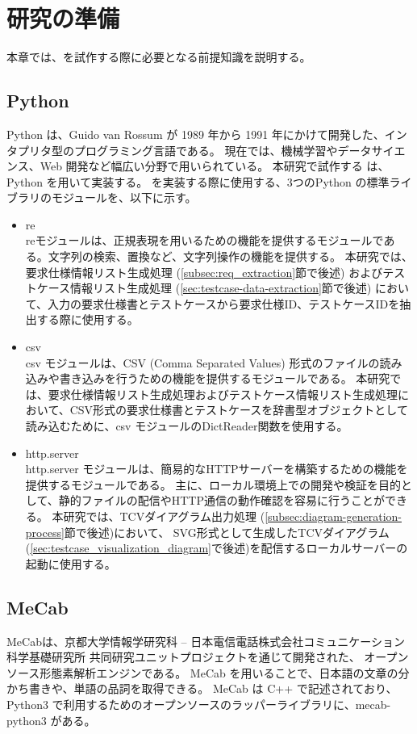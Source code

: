 \chapter{研究の準備}\label{cha:Preparation}

本章では、\tool{}を試作する際に必要となる前提知識を説明する。

\section{Python}\label{sec:Python}
Python \cite{python} は、Guido van Rossum が 1989 年から 1991 年にかけて開発した、インタプリタ型のプログラミング言語である。
現在では、機械学習やデータサイエンス、Web 開発など幅広い分野で用いられている。
本研究で試作する \tool は、Python を用いて実装する。
\tool を実装する際に使用する、3つのPython の標準ライブラリのモジュールを、以下に示す。

\begin{itemize}
    \item re \\
    reモジュールは、正規表現を用いるための機能を提供するモジュールである。文字列の検索、置換など、文字列操作の機能を提供する。
    本研究では、要求仕様情報リスト生成処理 (\ref{subsec:req_extraction}節で後述) およびテストケース情報リスト生成処理 (\ref{sec:testcase-data-extraction}節で後述) において、入力の要求仕様書とテストケースから要求仕様ID、テストケースIDを抽出する際に使用する。
    \item csv \\
    csv モジュールは、CSV (Comma Separated Values) 形式のファイルの読み込みや書き込みを行うための機能を提供するモジュールである。
    本研究では、要求仕様情報リスト生成処理およびテストケース情報リスト生成処理において、CSV形式の要求仕様書とテストケースを辞書型オブジェクトとして読み込むために、csv モジュールのDictReader関数を使用する。
    \item http.server \\
    http.server モジュールは、簡易的なHTTPサーバーを構築するための機能を提供するモジュールである。
    主に、ローカル環境上での開発や検証を目的として、静的ファイルの配信やHTTP通信の動作確認を容易に行うことができる。
    本研究では、TCVダイアグラム出力処理 (\cref{subsec:diagram-generation-process}節で後述)において、
    SVG形式として生成したTCVダイアグラム(\cref{sec:testcase_visualization_diagram}で後述)を配信するローカルサーバーの起動に使用する。
\end{itemize}


\section{MeCab}\label{sec:Mecab}
MeCabは、京都大学情報学研究科 -- 日本電信電話株式会社コミュニケーション科学基礎研究所 共同研究ユニットプロジェクトを通じて開発された、
オープンソース形態素解析エンジンである\cite{mecab}。
MeCab を用いることで、日本語の文章の分かち書きや、単語の品詞を取得できる。
MeCab は C++ で記述されており、Python3 で利用するためのオープンソースのラッパーライブラリに、mecab-python3 \cite{mecab_python3}がある。

